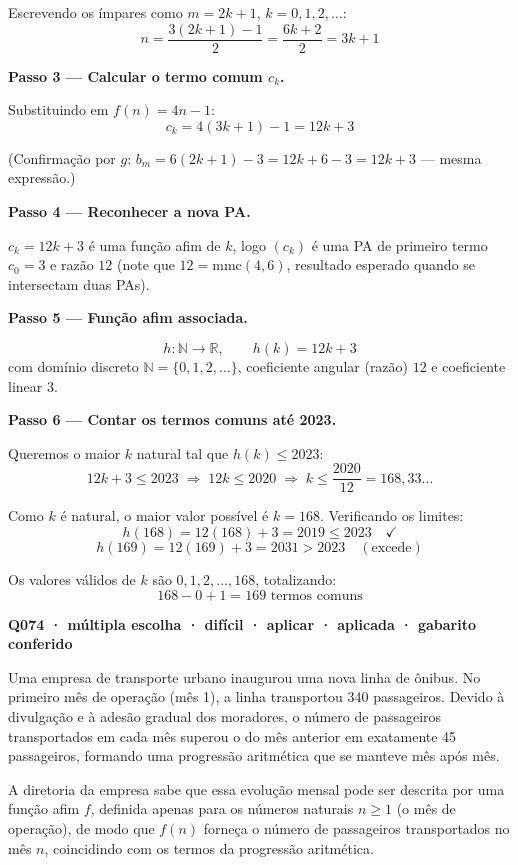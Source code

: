 \documentclass[11pt,a4paper]{article}
\begin{document}
Escrevendo os ímpares como $m = 2k+1$, $k = 0,1,2,\dots$:
$$n = \frac{3(2k+1)-1}{2} = \frac{6k+2}{2} = 3k+1$$

\textbf{Passo 3 — Calcular o termo comum $c_k$.}

Substituindo em $f(n) = 4n-1$:
$$c_k = 4(3k+1) - 1 = 12k + 3$$

(Confirmação por $g$: $b_m = 6(2k+1)-3 = 12k+6-3 = 12k+3$ — mesma expressão.)

\textbf{Passo 4 — Reconhecer a nova PA.}

$c_k = 12k+3$ é uma função afim de $k$, logo $(c_k)$ é uma PA de primeiro termo $c_0 = 3$ e razão $12$ (note que $12 = \text{mmc}(4,6)$, resultado esperado quando se intersectam duas PAs).

\textbf{Passo 5 — Função afim associada.}

$$h: \mathbb{N} \to \mathbb{R}, \qquad h(k) = 12k+3$$
com domínio discreto $\mathbb{N} = \{0,1,2,\dots\}$, coeficiente angular (razão) $12$ e coeficiente linear $3$.

\textbf{Passo 6 — Contar os termos comuns até 2023.}

Queremos o maior $k$ natural tal que $h(k) \le 2023$:
$$12k+3 \le 2023 \;\Longrightarrow\; 12k \le 2020 \;\Longrightarrow\; k \le \frac{2020}{12} = 168{,}33\ldots$$

Como $k$ é natural, o maior valor possível é $k=168$. Verificando os limites:
$$h(168) = 12(168)+3 = 2019 \le 2023 \quad\checkmark$$
$$h(169) = 12(169)+3 = 2031 > 2023 \quad(\text{excede})$$

Os valores válidos de $k$ são $0, 1, 2, \dots, 168$, totalizando:
$$168 - 0 + 1 = 169 \text{ termos comuns}$$

\bigskip\noindent\textbf{Q074 · múltipla escolha · difícil · aplicar · aplicada · gabarito conferido}\par\nopagebreak
Uma empresa de transporte urbano inaugurou uma nova linha de ônibus. No primeiro mês de operação (mês 1), a linha transportou 340 passageiros. Devido à divulgação e à adesão gradual dos moradores, o número de passageiros transportados em cada mês superou o do mês anterior em exatamente 45 passageiros, formando uma progressão aritmética que se manteve mês após mês.

A diretoria da empresa sabe que essa evolução mensal pode ser descrita por uma função afim $f$, definida apenas para os números naturais $n \geq 1$ (o mês de operação), de modo que $f(n)$ forneça o número de passageiros transportados no mês $n$, coincidindo com os termos da progressão aritmética.
\end{document}
